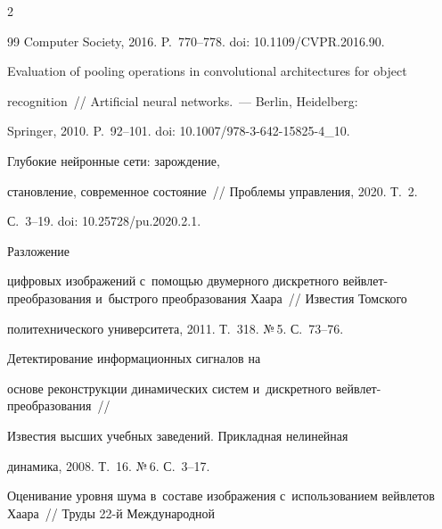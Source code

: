 \begin{multicols}{2}
{{\begin{thebibliography}{99}
Computer Society, 2016. P.~770--778. doi: 10.1109/CVPR.2016.90.


    






    Evaluation of pooling operations in convolutional architectures for object 


recognition~// Artificial neural networks.~--- Berlin, Heidelberg: 


Springer,   2010. P.~92--101. doi: 10.1007/978-3-642-15825-4\_10.


 




   Глубокие нейронные сети: за\-рож\-де\-ние, 


становление,     современное состояние~// Проб\-ле\-мы управ\-ле\-ния, 2020. Т.~2. 


С.~3--19. doi: 10.25728/pu.2020.2.1.


  




     Разложение 


цифровых     изоб\-ра\-же\-ний с~по\-мощью двумерного дискретного вейв\-лет-пре\-обра\-зо\-ва\-ния и~быст\-ро\-го   преобразования \mbox{Хаара}~// Известия Томского 


политехнического университета, 2011. Т.~318. №\,5. С.~73--76.


    




     Детектирование информационных сигналов на 


основе   реконструкции динамических сис\-тем и~дискретного вейв\-лет-пре\-обра\-зо\-ва\-ния~//\linebreak


 Известия  высших учебных заведений. Прикладная нелинейная 


динамика, 2008. Т.~16. №\,6. С.~3--17.







 Оценивание уровня шума в~составе изоб\-ра\-же\-ния с~использованием вейвлетов Хаара~// Труды 22-й Международной 



\end{thebibliography}}}
\end{multicols}
